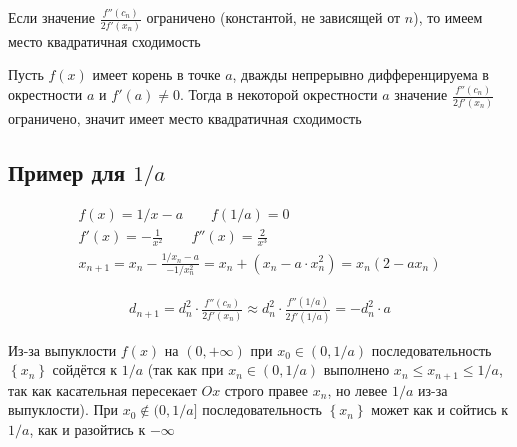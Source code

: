 Если значение $\frac{f''(c_n)}{2f'(x_n)}$ ограничено (константой, не зависящей от $n$), то имеем место квадратичная сходимость

Пусть $f(x)$ имеет корень в точке $a$, дважды непрерывно дифференцируема в окрестности $a$ и $f'(a) \neq 0$.
Тогда в некоторой окрестности $a$ значение $\frac{f''(c_n)}{2f'(x_n)}$ ограничено, значит имеет место квадратичная сходимость

\subsection{Пример для $1/a$}

\begin{gather}
    f(x) = 1/x - a \qquad f(1/a) = 0 \\
    f'(x) = -\frac{1}{x^2} \qquad f''(x) = \frac{2}{x^3} \\
    x_{n + 1} = x_n - \frac{1/x_n - a}{-1/x_n^2} = x_n + \left(x_n - a \cdot x_n^2\right) = x_n (2 - ax_n)
\end{gather}


\begin{gather}
    d_{n + 1} = d_n^2 \cdot \frac{f''(c_n)}{2f'(x_n)} \approx d_n^2 \cdot \frac{f''(1/a)}{2f'(1/a)} = -d_n^2 \cdot a
\end{gather}


\begin{center}
\end{center}

Из-за выпуклости $f(x)$ на $(0, +\infty)$ при $x_0 \in (0, 1/a)$ последовательность $\left\{x_n\right\}$ сойдётся к $1/a$
(так как при $x_n \in (0, 1/a)$ выполнено $x_n \le x_{n + 1} \le 1/a$, так как касательная пересекает $Ox$ строго правее $x_n$, но левее $1/a$ из-за выпуклости).
При $x_0 \notin (0, 1/a]$ последовательность $\left\{x_n\right\}$ может как и сойтись к $1/a$, как и разойтись к $-\infty$

